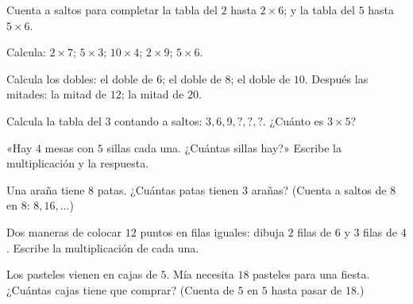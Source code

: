 \begin{exercise}[$\star$]\label{exo:g2:mult:3}
Cuenta a saltos para completar la tabla del $2$ hasta $2 \times 6$; y la tabla
del $5$ hasta $5 \times 6$.
\end{exercise}

\begin{exercise}[$\star$]\label{exo:g2:mult:4}
Calcula: $2 \times 7$; \quad $5 \times 3$; \quad $10 \times 4$;
\quad $2 \times 9$; \quad $5 \times 6$.
\end{exercise}

\begin{exercise}[$\star$]\label{exo:g2:mult:5}
Calcula los dobles: el doble de $6$; el doble de $8$; el doble de $10$.
Después las mitades: la mitad de $12$; la mitad de $20$.
\end{exercise}

\begin{exercise}[$\star$]\label{exo:g2:mult:6}
Calcula la tabla del $3$ contando a saltos: $3, 6, 9, ?, ?, ?$. ¿Cuánto
es $3 \times 5$?
\end{exercise}

\begin{exercise}[$\star$]\label{exo:g2:mult:7}
«Hay $4$ mesas con $5$ sillas cada una. ¿Cuántas sillas hay?»
Escribe la multiplicación y la respuesta.
\end{exercise}

\begin{exercise}[$\star$]\label{exo:g2:mult:8}
Una araña tiene $8$ patas. ¿Cuántas patas tienen $3$ arañas? (Cuenta a saltos
de $8$ en $8$: $8, 16, \dots$)
\end{exercise}

\begin{exercise}[$\star$]\label{exo:g2:mult:9}
Dos maneras de colocar $12$ puntos en filas iguales: dibuja $2$ filas de $6$
y $3$ filas de $4$. Escribe la multiplicación de cada una.
\end{exercise}

\begin{exercise}[$\star\star$]\label{exo:g2:mult:10}
Los pasteles vienen en cajas de $5$. Mía necesita $18$ pasteles para una fiesta.
¿Cuántas cajas tiene que comprar? (Cuenta de $5$ en $5$ hasta pasar de $18$.)
\end{exercise}
